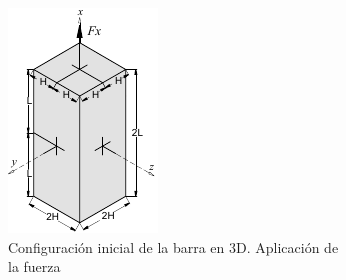 \documentclass{exam}
\begin{document}
\begin{figure}[h]
	\centering
	\begin{subfigure}[l]{0.23\textwidth}
		\includegraphics[width=\textwidth]{images/barra.pdf} 
		\caption{Configuración inicial de la barra en 3D. Aplicación de la fuerza}
		\label{sfig:barra3D}
	\end{subfigure}	
	\hspace*{15mm}
	\begin{subfigure}[r]{0.23\textwidth}

\end{subfigure}
\end{figure}
\end{document}
